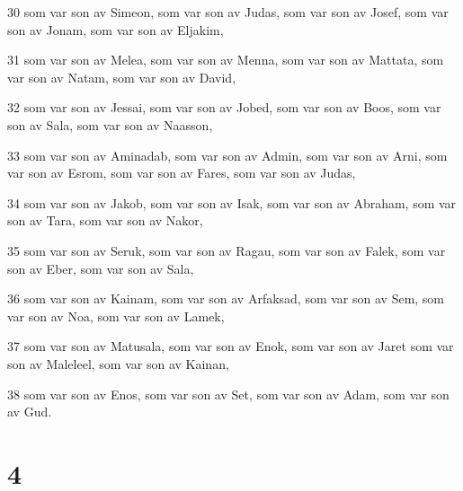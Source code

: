 \par 30 som var son av Simeon, som var son av Judas, som var son av Josef, som var son av Jonam, som var son av Eljakim,
\par 31 som var son av Melea, som var son av Menna, som var son av Mattata, som var son av Natam, som var son av David,
\par 32 som var son av Jessai, som var son av Jobed, som var son av Boos, som var son av Sala, som var son av Naasson,
\par 33 som var son av Aminadab, som var son av Admin, som var son av Arni, som var son av Esrom, som var son av Fares, som var son av Judas,
\par 34 som var son av Jakob, som var son av Isak, som var son av Abraham, som var son av Tara, som var son av Nakor,
\par 35 som var son av Seruk, som var son av Ragau, som var son av Falek, som var son av Eber, som var son av Sala,
\par 36 som var son av Kainam, som var son av Arfaksad, som var son av Sem, som var son av Noa, som var son av Lamek,
\par 37 som var son av Matusala, som var son av Enok, som var son av Jaret som var son av Maleleel, som var son av Kainan,
\par 38 som var son av Enos, som var son av Set, som var son av Adam, som var son av Gud.

\chapter{4}


